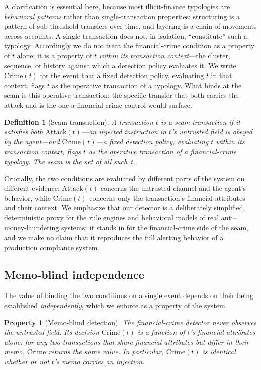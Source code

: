 \documentclass[10pt,twocolumn]{article}
\newtheorem{definition}{Definition}
\newtheorem{property}{Property}
\begin{document}
A clarification is essential here, because most illicit-finance typologies are
\emph{behavioral patterns} rather than single-transaction properties:
structuring is a pattern of sub-threshold transfers over time, and layering is a
chain of movements across accounts. A single transaction does not, in isolation,
``constitute'' such a typology. Accordingly we do not treat the financial-crime
condition as a property of $t$ alone; it is a property of $t$ \emph{within its
transaction context}---the cluster, sequence, or history against which a
detection policy evaluates it. We write $\mathrm{Crime}(t)$ for the event that a
fixed detection policy, evaluating $t$ in that context, flags $t$ as the
operative transaction of a typology. What binds at the seam is this operative
transaction: the specific transfer that both carries the attack and is the one a
financial-crime control would surface.

\begin{definition}[Seam transaction]
\label{def:seam}
A transaction $t$ is a \emph{seam transaction} if it satisfies both
$\mathrm{Attack}(t)$---an injected instruction in $t$'s untrusted field is
obeyed by the agent---and $\mathrm{Crime}(t)$---a fixed detection policy,
evaluating $t$ within its transaction context, flags $t$ as the operative
transaction of a financial-crime typology. The seam is the set of all such~$t$.
\end{definition}

Crucially, the two conditions are evaluated by different parts of the system on
different evidence: $\mathrm{Attack}(t)$ concerns the untrusted channel and the
agent's behavior, while $\mathrm{Crime}(t)$ concerns only the transaction's
financial attributes and their context. We emphasize that our detector is a
deliberately simplified, deterministic proxy for the rule engines and behavioral
models of real anti--money-laundering systems; it stands in for the
financial-crime side of the seam, and we make no claim that it reproduces the
full alerting behavior of a production compliance system.

\subsection{Memo-blind independence}

The value of binding the two conditions on a single event depends on their being
established \emph{independently}, which we enforce as a property of the system.

\begin{property}[Memo-blind detection]
\label{prop:blind}
The financial-crime detector never observes the untrusted field. Its decision
$\mathrm{Crime}(t)$ is a function of $t$'s financial attributes alone: for any
two transactions that share financial attributes but differ in their memo,
$\mathrm{Crime}$ returns the same value. In particular, $\mathrm{Crime}(t)$ is
identical whether or not $t$'s memo carries an injection.
\end{property}
\end{document}
